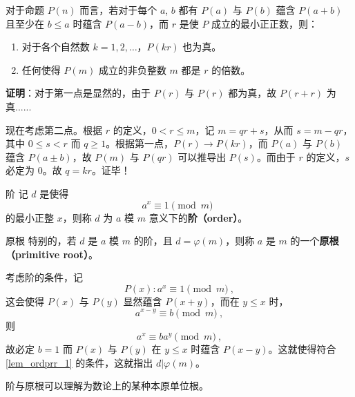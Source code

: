 
\begin{lemma}{}\label{lem_ordprr_1}
对于命题 $P(n)$ 而言，若对于每个 $a$, $b$ 都有 $P(a)$ 与 $P(b)$ 蕴含 $P(a+b)$ 且至少在 $b \le a$ 时蕴含 $P(a-b)$，而 $r$ 是使 $P$ 成立的最小正正数，则：
\begin{enumerate}
\item 对于各个自然数 $k = 1, 2, \dots$，$P(kr)$ 也为真。
\item 任何使得 $P(m)$ 成立的非负整数 $m$ 都是 $r$ 的倍数。
\end{enumerate}
\end{lemma}
\textbf{证明}：对于第一点是显然的，由于 $P(r)$ 与 $P(r)$ 都为真，故 $P(r+r)$ 为真......

现在考虑第二点。根据 $r$ 的定义，$0 < r \le m$，记 $m = qr + s$，从而 $s = m - qr$，其中 $0 \le s < r$ 而 $q \ge 1$。根据第一点，$P(r) \rightarrow P(kr)$，而 $P(a)$ 与 $P(b)$ 蕴含 $P(a \pm b)$，故 $P(m)$ 与 $P(qr)$ 可以推导出 $P(s)$。而由于 $r$ 的定义，$s$ 必定为 $0$。故 $q = kr$。证毕！


\begin{definition}{阶}
记 $d$ 是使得
\begin{equation}
a^x \equiv 1 \pmod m ~~
\end{equation}
的最小正整 $x$，则称 $d$ 为 $a$ 模 $m$ 意义下的\textbf{阶（order）}。
\end{definition}

\begin{definition}{原根}
特别的，若 $d$ 是 $a$ 模 $m$ 的阶，且 $d = \varphi(m)$，则称 $a$ 是 $m$ 的一个\textbf{原根（primitive root）}。
\end{definition}

考虑阶的条件，记
\begin{equation}
P(x) : a^x \equiv 1 \pmod m ~,
\end{equation}
这会使得 $P(x)$ 与 $P(y)$ 显然蕴含 $P(x+y)$，而在 $y \le x$ 时，
\begin{equation}
a^{x-y} \equiv b \pmod m ~,
\end{equation}
则
\begin{equation}
a^x \equiv b a^y \pmod m ~,
\end{equation}
故必定 $b=1$ 而 $P(x)$ 与 $P(y)$ 在 $y \le x$ 时蕴含 $P(x-y)$。这就使得符合\autoref{lem_ordprr_1} 的条件，这就指出 $d | \varphi(m)$。

阶与原根可以理解为数论上的某种本原单位根。
